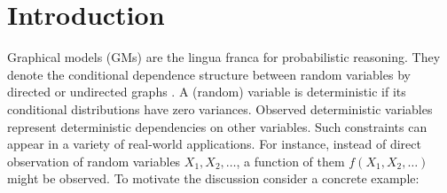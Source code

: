 \documentclass{article}
\begin{document}
\section{Introduction}
\label{sect:intro}
Graphical models (GMs) are the lingua franca for probabilistic reasoning.
They denote the conditional dependence structure between random variables by directed or undirected graphs \cite{koller2009probabilistic}. A (random) variable is deterministic if its conditional distributions have zero variances. 
Observed deterministic variables represent deterministic dependencies on other variables.
Such constraints can appear in a variety of real-world applications.
For instance, instead of direct observation of random variables 
$X_1, X_2, \ldots$, a function of them $f(X_1, X_2, \ldots)$ might be observed. 
To motivate the discussion consider a concrete example:  
\end{document}
